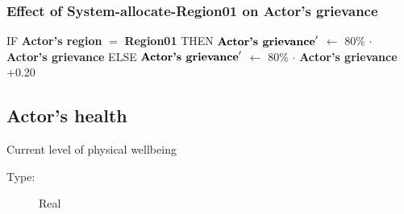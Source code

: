 \documentclass{article}%
\begin{document}
\subsubsection{Effect of System{-}allocate{-}Region01 on Actor's grievance}%
\label{ssubsec:Effect of System{-}allocate{-}Region01 on Actor's grievance}%
\begin{flushleft}%
IF %
\textbf{Actor's region}%
$=$%
\textbf{Region01}%
\linebreak%
\hspace*{2em}%
THEN %
$\mbox{\textbf{Actor's grievance}} '$%
$\leftarrow$%
80\%%
$\cdot$%
\textbf{Actor's grievance}%
\linebreak%
\hspace*{2em}%
ELSE %
$\mbox{\textbf{Actor's grievance}} '$%
$\leftarrow$%
80\%%
$\cdot$%
\textbf{Actor's grievance}%
+0.20%
\end{flushleft}

%
\subsection{Actor's health}%
\label{subsec:Actor's health}%
Current level of physical wellbeing%
\begin{description}%
\item[Type:]%
Real%
\end{description}%
\end{document}
